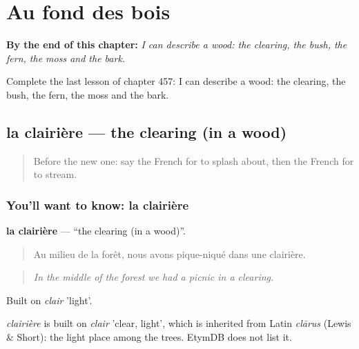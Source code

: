 
\chapter{Au fond des bois}
\label{ch:fr-au-fond-des-bois}

\begin{chapteropening}
\textbf{By the end of this chapter:} \emph{I can describe a wood: the clearing, the bush, the fern, the moss and the bark.}

Complete the last lesson of chapter 457: I can describe a wood: the clearing, the bush, the fern, the moss and the bark.
\end{chapteropening}

\section[la clairière]{la clairière — the clearing (in a wood)}

\label{lesson:FR-C457-clairiere}



\begin{quote}
Before the new one: say the French for to splash about, then the French for to stream.
\end{quote}

\subsection*{You'll want to know: la clairière}
\textbf{la clairière} — \textquotedblleft{}the clearing (in a wood)\textquotedblright{}.

\begin{quote}
Au milieu de la forêt, nous avons pique-niqué dans une clairière.
\end{quote}

\begin{quote}
\emph{In the middle of the forest we had a picnic in a clearing.}
\end{quote}

Built on \emph{clair} 'light'.

\begin{cousinweb}
\emph{clairière} is built on \emph{clair} 'clear, light', which is inherited from Latin \emph{clārus} (Lewis \& Short): the light place among the trees. EtymDB does not list it.
\end{cousinweb}

